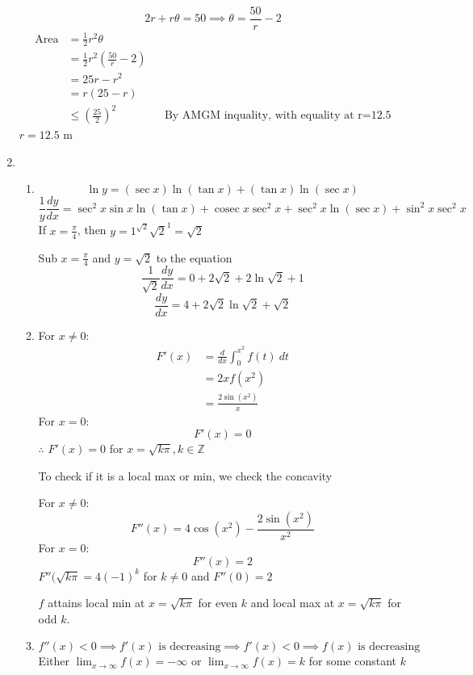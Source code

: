 \documentclass[12pt]{article}
\DeclareMathOperator{\cosec}{cosec}
\theoremstyle{definition}
\begin{document}
\begin{enumerate}
        \[2r+r\theta=50 \implies \theta = \frac{50}{r} -2\]
        \begin{align*}
          \text{Area} &= \frac{1}{2}r^2\theta \\
            &= \frac{1}{2}r^2\left(\frac{50}{r}-2\right) \\
            &= 25r - r^2 \\
            &= r(25-r) \\
            &\leq \left(\frac{25}{2}\right)^2 && \text{By AMGM inquality, with equality at r=12.5}
        \end{align*}
        $r=12.5$ m
  \item \begin{enumerate}[label=(\alph*)]
          \item \[\ln y = (\sec x)\ln(\tan x) + (\tan x)\ln(\sec x)\]
                \[\frac{1}{y}\frac{dy}{dx} = \sec^2 x\sin x \ln(\tan x) + \cosec x \sec^2 x + \sec^2 x \ln (\sec x) + \sin^2 x\sec^2 x\]
                If $x=\frac{\pi}{4}$, then $y=1^{\sqrt{2}}\sqrt{2}^1=\sqrt{2}$
                
                Sub $x=\frac{\pi}{4}$ and $y=\sqrt{2}$ to the equation
                \[\frac{1}{\sqrt{2}}\frac{dy}{dx} = 0 + 2\sqrt{2} + 2\ln\sqrt{2} +1\]
                \[\frac{dy}{dx} = 4+2\sqrt{2}\ln\sqrt{2}+\sqrt{2}\]
          \item For $x\neq 0$:
                \begin{align*}
                  F'(x) &= \frac{d}{dx}\int_0^{x^2}f(t)\ dt \\
                    &= 2xf(x^2) \\
                    &= \frac{2\sin(x^2)}{x} 
                \end{align*}
                For $x = 0$:
                \[F'(x) = 0\]
                $\therefore$ $F'(x)=0$ for $x=\sqrt{k\pi},k\in \mathbb{Z}$
                
                To check if it is a local max or min, we check the concavity
                
                For $x\neq 0$:
                \[F''(x) = 4\cos(x^2)-\frac{2\sin(x^2)}{x^2}\]
                For $x=0$:
                \[F''(x) = 2\]
                $F''(\sqrt{k\pi} = 4(-1)^k$ for $k\neq 0$ and $F''(0) = 2$
                
                $f$ attains local min at $x=\sqrt{k\pi}$ for even $k$ and local max at $x=\sqrt{k\pi}$ for odd $k$.
          \item \[f''(x)<0 \implies f'(x)\text{ is decreasing} \implies f'(x)<0 \implies f(x)\text{ is decreasing}\]
                Either $\lim_{x\to \infty}f(x)=-\infty$ or $\lim_{x\to \infty}f(x)=k$ for some constant $k$
                

\end{enumerate}
\end{enumerate}
\end{document}

